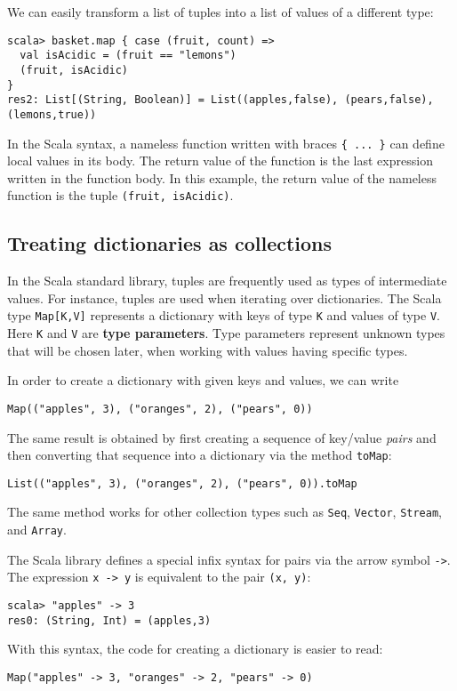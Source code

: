 We can easily transform a list of tuples into a list of values of
a different type:
\begin{lstlisting}
scala> basket.map { case (fruit, count) =>
  val isAcidic = (fruit == "lemons")
  (fruit, isAcidic)
}
res2: List[(String, Boolean)] = List((apples,false), (pears,false), (lemons,true)) 
\end{lstlisting}
In the Scala syntax, a nameless function written with braces \lstinline!{ ... }!
can define local values in its body. The return value of the function
is the last expression written in the function body. In this example,
the return value of the nameless function is the tuple \lstinline!(fruit, isAcidic)!.

\subsection{Treating dictionaries as collections}

In the Scala standard library, tuples are frequently used as types
of intermediate values. For instance, tuples are used when iterating
over dictionaries. The Scala type \lstinline!Map[K,V]! represents
a dictionary with keys of type \lstinline!K! and values of type \lstinline!V!.
Here \lstinline!K! and \lstinline!V! are \textbf{type parameters}.
Type parameters represent unknown types that will be chosen later,
when working with values having specific types.

In order to create a dictionary with given keys and values, we can
write
\begin{lstlisting}
Map(("apples", 3), ("oranges", 2), ("pears", 0))
\end{lstlisting}
The same result is obtained by first creating a sequence of key/value
\emph{pairs} and then converting that sequence into a dictionary via
the method \lstinline!toMap!:
\begin{lstlisting}
List(("apples", 3), ("oranges", 2), ("pears", 0)).toMap
\end{lstlisting}
The same method works for other collection types such as \lstinline!Seq!,
\lstinline!Vector!, \lstinline!Stream!, and \lstinline!Array!. 

The Scala library defines a special infix syntax for pairs via the
arrow symbol \lstinline!->!. The expression \lstinline!x -> y! is
equivalent to the pair \lstinline!(x, y)!:
\begin{lstlisting}
scala> "apples" -> 3
res0: (String, Int) = (apples,3)
\end{lstlisting}
With this syntax, the code for creating a dictionary is easier to
read:
\begin{lstlisting}
Map("apples" -> 3, "oranges" -> 2, "pears" -> 0)
\end{lstlisting}

